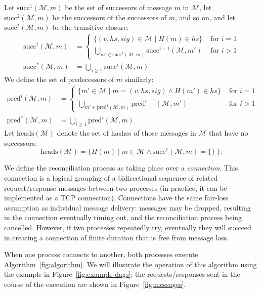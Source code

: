\documentclass[a4paper,anonymous,USenglish]{lipics-v2019}
\begin{document}
Let $\mathrm{succ}^1(\mathcal{M}, m)$ be the set of successors of message $m$ in $\mathcal{M}$, let $\mathrm{succ}^2(\mathcal{M}, m)$ be the successors of the successors of $m$, and so on, and let $\mathrm{succ}^*(\mathcal{M}, m)$ be the transitive closure:
\begin{align*}
\mathrm{succ}^i(\mathcal{M}, m) &=
\begin{cases}
\{(v, \mathit{hs}, \mathit{sig}) \in \mathcal{M} \mid H(m) \in \mathit{hs}\} & \text{ for } i=1 \\
\bigcup_{m' \in \mathrm{succ}^1(\mathcal{M}, m)} \mathrm{succ}^{i-1}(\mathcal{M}, m') & \text{ for } i>1
\end{cases} \\
\mathrm{succ}^*(\mathcal{M}, m) &= \bigcup_{i \ge 1} \mathrm{succ}^i(\mathcal{M}, m)
\end{align*}
We define the set of predecessors of $m$ similarly:
\begin{align*}
\mathrm{pred}^i(\mathcal{M}, m) &=
\begin{cases}
\{ m' \in \mathcal{M} \mid m = (v, \mathit{hs}, \mathit{sig}) \wedge H(m') \in \mathit{hs}\} & \text{ for } i=1 \\
\bigcup_{m' \in \mathrm{pred}^1(\mathcal{M}, m)} \mathrm{pred}^{i-1}(\mathcal{M}, m') & \text{ for } i>1
\end{cases} \\
\mathrm{pred}^*(\mathcal{M}, m) &= \bigcup_{i \ge 1} \mathrm{pred}^i(\mathcal{M}, m)
\end{align*}
Let $\mathrm{heads}(\mathcal{M})$ denote the set of hashes of those messages in $\mathcal{M}$ that have no successors:
\[ \mathrm{heads}(\mathcal{M}) = \{H(m) \mid m \in \mathcal{M} \wedge \mathrm{succ}^1(\mathcal{M}, m) = \{\}\;\}. \]

We define the reconciliation process as taking place over a \emph{connection}.
This connection is a logical grouping of a bidirectional sequence of related request/response messages between two processes (in practice, it can be implemented as a TCP connection).
Connections have the same fair-loss assumption as individual message delivery: messages may be dropped, resulting in the connection eventually timing out, and the reconciliation process being cancelled.
However, if two processes repeatedly try, eventually they will succeed in creating a connection of finite duration that is free from message loss.

When one process connects to another, both processes execute Algorithm~\ref{fig:algorithm}.
We will illustrate the operation of this algorithm using the example in Figure~\ref{fig:example-dags}; the requests/responses sent in the course of the execution are shown in Figure~\ref{fig:messages}.
\end{document}
